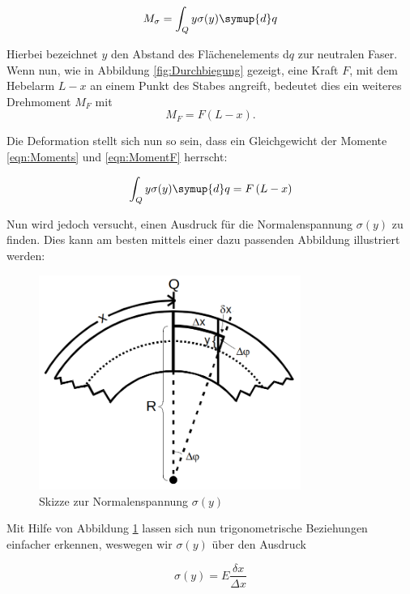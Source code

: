 \begin{equation}
\label{eqn:Moments}
    M_\sigma = \int_Q y\sigma(y)\symup{d}q 
\end{equation}

\noindent Hierbei bezeichnet $y$ den Abstand des Flächenelements d$q$ zur neutralen Faser.\\
Wenn nun, wie in Abbildung \ref{fig:Durchbiegung} gezeigt, eine Kraft $F$, mit dem Hebelarm $L-x$ an einem Punkt des Stabes angreift, bedeutet dies
ein weiteres Drehmoment $M_F$ mit
\begin{equation}
\label{eqn:MomentF}
    M_F = F\left(L-x\right).
\end{equation}

\noindent Die Deformation stellt sich nun so sein, dass ein Gleichgewicht der Momente \eqref{eqn:Moments} und \eqref{eqn:MomentF} herrscht:

\begin{equation}
\label{eqn:Moment1}
    \int_Q y\sigma(y)\symup{d}q =F\left(L-x\right)
\end{equation}

\noindent Nun wird jedoch versucht, einen Ausdruck für die Normalenspannung $\sigma(y)$ zu finden. Dies kann am besten mittels
einer dazu passenden Abbildung illustriert werden:

\begin{figure}
    \centering
    \includegraphics[height=7cm]{./content/Trigonometrie.png}
    \caption{Skizze zur Normalenspannung $\sigma(y)$}
    \label{fig:Trigonometrie}
\end{figure}

\noindent Mit Hilfe von Abbildung \ref{fig:Trigonometrie} lassen sich nun trigonometrische Beziehungen einfacher erkennen, weswegen
wir $\sigma(y)$ über den Ausdruck

\begin{equation}
\label{eqn:Normalenspannung}
    \sigma(y) = E\frac{\delta x}{\Delta x}
\end{equation}

